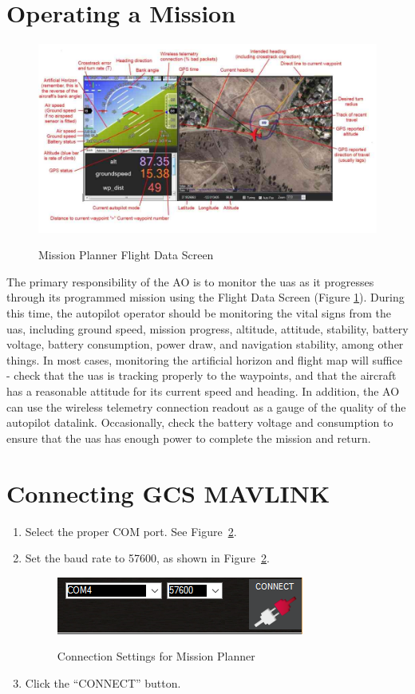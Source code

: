 \documentclass{report}
\begin{document}
	\section{Operating a Mission}
		\begin{figure}[ht]
			\centering
			\caption{Mission Planner Flight Data Screen}
			\includegraphics[width=\textwidth]{mp_hud_full.jpg}
			\label{fig:mp_flt_data}
		\end{figure}
		The primary responsibility of the \gls{AO} is to monitor the \gls{uas} as it progresses through its programmed mission using the Flight Data Screen (Figure \ref{fig:mp_flt_data}).  During this time, the autopilot operator should be monitoring the vital signs from the \gls{uas}, including ground speed, mission progress, altitude, attitude, stability, battery voltage, battery consumption, power draw, and navigation stability, among other things.  In most cases, monitoring the artificial horizon and flight map will suffice - check that the \gls{uas} is tracking properly to the waypoints, and that the aircraft has a reasonable attitude for its current speed and heading.  In addition, the \gls{AO} can use the wireless telemetry connection readout as a gauge of the quality of the autopilot datalink.  Occasionally, check the battery voltage and consumption to ensure that the \gls{uas} has enough power to complete the mission and return.
	\section{Connecting GCS MAVLINK}
		\begin{enumerate}
			\item Select the proper COM port.  See Figure~\ref{fig:MP_Connect}.
			\item Set the baud rate to 57600, as shown in Figure~\ref{fig:MP_Connect}.
				\begin{figure}[ht]
					\centering
					\caption{Connection Settings for Mission Planner}
					\includegraphics{MisionPlanner_ConnectButton.png}
					\label{fig:MP_Connect}
				\end{figure}
			\item Click the ``CONNECT'' button.
		\end{enumerate}
\printglossaries
\end{document}
